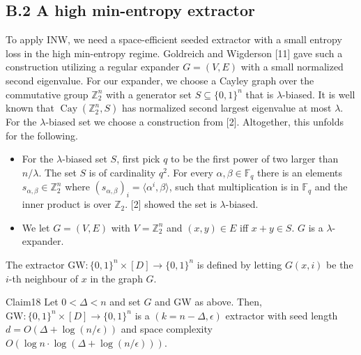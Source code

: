\subsection*{B.2 A high min-entropy extractor}
To apply INW, we need a space-efficient seeded extractor with a small entropy loss in the high min-entropy regime. Goldreich and Wigderson [11] gave such a construction utilizing a regular expander $G=(V,E)$ with a small normalized second eigenvalue. For our expander, we choose a Cayley graph over the commutative group $\mathbb Z_2^n$ with a generator set $S\subseteq\{0,1\}^n$ that is $\lambda$-biased. It is well known that $\operatorname{Cay}(\mathbb Z_2^n,S)$ has normalized second largest eigenvalue at most $\lambda$. For the $\lambda$-biased set we choose a construction from [2]. Altogether, this unfolds for the following.
\begin{itemize}
\item For the $\lambda$-biased set $S$, first pick $q$ to be the first power of two larger than $n/\lambda$. The set $S$ is of cardinality $q^2$. For every $\alpha,\beta\in\mathbb F_q$ there is an elements $s_{\alpha,\beta}\in\mathbb Z_2^n$ where $(s_{\alpha,\beta})_i=\langle\alpha^i,\beta\rangle$, such that multiplication is in $\mathbb F_q$ and the inner product is over $\mathbb Z_2$. [2] showed the set is $\lambda$-biased.
\item We let $G=(V,E)$ with $V=\mathbb Z_2^n$ and $(x,y)\in E$ iff $x+y\in S$. $G$ is a $\lambda$-expander.
\end{itemize}
The extractor $\mathrm{GW}:\{0,1\}^n\times[D]\to\{0,1\}^n$ is defined by letting $G(x,i)$ be the $i$-th neighbour of $x$ in the graph $G$.
\begin{authorclaim}{Claim18}
Let $0<\Delta<n$ and set $G$ and GW as above. Then, $\mathrm{GW}:\{0,1\}^n\times[D]\to\{0,1\}^n$ is a $(k=n-\Delta,\epsilon)$ extractor with seed length $d=O(\Delta+\log(n/\epsilon))$ and space complexity $O(\log n\cdot\log(\Delta+\log(n/\epsilon)))$.
\end{authorclaim}
